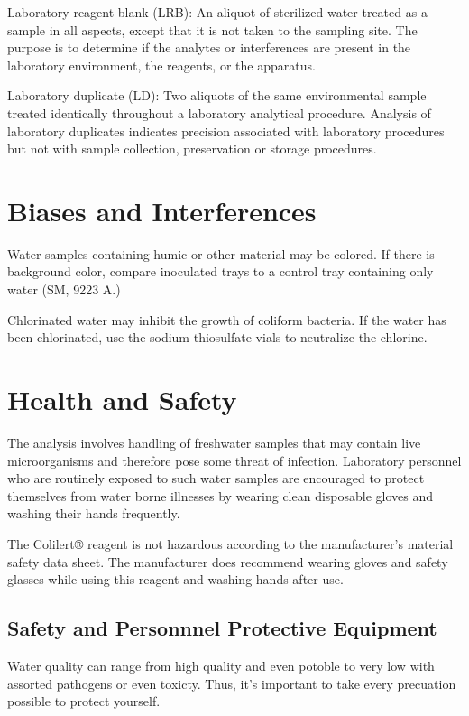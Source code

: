 \documentclass[12pt]{../SOP4_alpha}\usepackage[]{graphicx}\usepackage[]{xcolor}
\begin{document}
\NP Laboratory reagent blank (LRB): An aliquot of sterilized water treated as a
sample in all aspects, except that it is not taken to the sampling site. The
purpose is to determine if the analytes or interferences are present in the
laboratory environment, the reagents, or the apparatus.

\NP Laboratory duplicate (LD): Two aliquots of the same environmental sample
treated identically throughout a laboratory analytical procedure. Analysis
of laboratory duplicates indicates precision associated with laboratory
procedures but not with sample collection, preservation or storage
procedures. 


\section{Biases and Interferences}
\NP Water samples containing humic or other material may be colored. If there is
background color, compare inoculated trays to a control tray containing only
water (SM, 9223 A.) 

\NP Chlorinated water may inhibit the growth of coliform bacteria. If the water has been 
chlorinated, use the sodium thiosulfate vials to neutralize the chlorine.

\section{Health and Safety}

\NP The analysis involves handling of freshwater samples that may contain live
microorganisms and therefore pose some threat of infection. Laboratory personnel
who are routinely exposed to such water samples are encouraged to protect
themselves from water borne illnesses by wearing clean disposable gloves and
washing their hands frequently.

\NP The Colilert® reagent is not hazardous according to the manufacturer’s material
safety data sheet. The manufacturer does recommend wearing gloves and safety
glasses while using this reagent and washing hands after use. 


\subsection{Safety and Personnnel Protective Equipment}

Water quality can range from high quality and even potoble to very low with assorted pathogens or even toxicty. Thus, it's important to take every precuation possible to protect yourself. 
\end{document}
